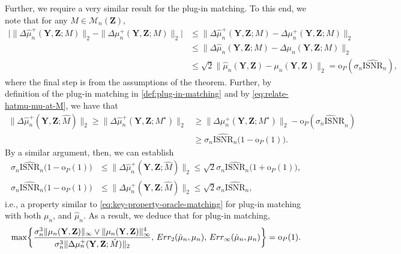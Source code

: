 \documentclass[12pt]{article}
\newcommand{\ISNR}{\mathrm{ISNR}}
\newcommand{\bY}{\mathbf{Y}}
\newcommand{\bZ}{\mathbf{Z}}
\begin{document}
Further, we require a very similar result for the plug-in matching.
To this end, we note that for any $M \in \mathcal{M}_n(\bZ)$,
\begin{align}\label{eq:relate-hatmu-mu-at-M}
    \bigl|\|\Delta\hat{\mu}_n^+(\bY,\bZ;M)\|_2-\|\Delta\mu_n^+(\bY,\bZ;M)\|_2\bigr|&\leq \|\Delta\hat{\mu}_n^+(\bY,\bZ;M)-\Delta\mu_n^+(\bY,\bZ;M)\|_2\nonumber\\
    &\leq \|\Delta\hat{\mu}_n(\bY,\bZ;M)-\Delta\mu_n(\bY,\bZ;M)\|_2\nonumber\\
    &\leq \sqrt{2}\|\hat\mu_n(\bY,\bZ)-\mu_n(\bY,\bZ)\|_2 = \mathrm{o}_P(\sigma_n\widehat{\ISNR}_n),
\end{align}
where the final step is from the assumptions of the theorem. 
Further, by definition of the plug-in matching in \eqref{def:plug-in-matching} and by \eqref{eq:relate-hatmu-mu-at-M},  we have that 
\begin{align*}
    \|\Delta\hat{\mu}_n^+(\bY,\bZ;\hat{M})\|_2 \geq \|\Delta\hat{\mu}_n^+(\bY,\bZ;M^\star)\|_2 &\geq \|\Delta\mu_n^+(\bY,\bZ;M^\star)\|_2 - \mathrm{o}_P(\widehat{\sigma_n\ISNR}_n) \\
    &\geq \sigma_n\widehat{\ISNR}_n \bigl(1-\mathrm{o}_P(1)\bigr).
\end{align*}
By a similar argument, then, we can establish 
\begin{align}\label{eq:lower-bound-at-Mhat}
    \sigma_n\widehat{\ISNR}_n \bigl(1-\mathrm{o}_P(1)\bigr)&\leq \|\Delta\hat{\mu}_n^+(\bY,\bZ;\hat{M})\|_2\leq \sqrt{2} \sigma_n\widehat{\ISNR}_n \bigl(1+\mathrm{o}_P(1)\bigr),\nonumber \\
     \sigma_n\widehat{\ISNR}_n \bigl(1-\mathrm{o}_P(1)\bigr)&\leq \|\Delta\mu_n^+(\bY,\bZ;\hat{M})\|_2\leq \sqrt{2} \sigma_n\widehat{\ISNR}_n,
\end{align}
i.e., a property similar to \eqref{eq:key-property-oracle-matching} for plug-in matching with both $\mu_n$, and $\hat{\mu}_n$.
As a result, we deduce that  for plug-in matching,
\begin{align}\label{eqn:oracle_assumption_del_mu_level}
         \max\biggl\{\frac{\sigma_n^3\|\mu_n(\bY,\bZ)\|_\infty\vee \|\mu_n(\bY,\bZ)\|_\infty^4}{\sigma_n^3\|\Delta\mu_n^+(\bY,\bZ;\hat{M})\|_2},\,\textnormal{Err}_2(\hat{\mu}_n,\mu_n),\,\textnormal{Err}_\infty(\hat{\mu}_n,\mu_n)\biggr\}=\mathrm{o}_P(1).
     \end{align}
     
\end{document}
